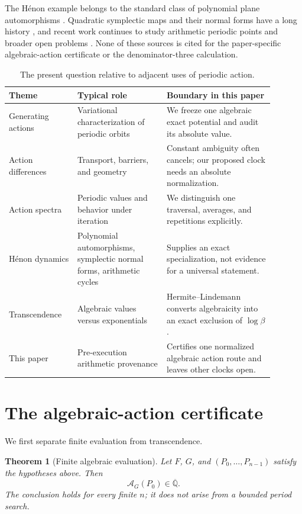 \documentclass[11pt]{article}
\newtheorem{theorem}{Theorem}[section]
\theoremstyle{definition}
\theoremstyle{remark}
\newcommand{\Qbar}{\overline{\mathbb Q}}
\newcommand{\Action}{\mathcal A}
\begin{document}
The H\'enon example belongs to the standard class of polynomial plane
automorphisms \citep{friedland1989dynamical}.  Quadratic symplectic maps and
their normal forms have a long history \citep{moser1994quadratic}, and recent
work continues to study arithmetic periodic points and broader open problems
\citep{dehenon2024open,kim2024many}.  None of these sources is cited for the
paper-specific algebraic-action certificate or the denominator-three
calculation.

\begin{table}[H]
\centering
\small
\caption{The present question relative to adjacent uses of periodic action.}
\label{tab:context}
\begin{tabular}{@{}p{0.23\linewidth}p{0.30\linewidth}p{0.36\linewidth}@{}}
\toprule
Theme & Typical role & Boundary in this paper \\
\midrule
Generating actions & Variational characterization of periodic orbits & We freeze one algebraic exact potential and audit its absolute value. \\
Action differences & Transport, barriers, and geometry & Constant ambiguity often cancels; our proposed clock needs an absolute normalization. \\
Action spectra & Periodic values and behavior under iteration & We distinguish one traversal, averages, and repetitions explicitly. \\
H\'enon dynamics & Polynomial automorphisms, symplectic normal forms, arithmetic cycles & Supplies an exact specialization, not evidence for a universal statement. \\
Transcendence & Algebraic values versus exponentials & Hermite--Lindemann converts algebraicity into an exact exclusion of $\log\beta$. \\
This paper & Pre-execution arithmetic provenance & Certifies one normalized algebraic action route and leaves other clocks open. \\
\bottomrule
\end{tabular}
\end{table}

\section{The algebraic-action certificate}
\label{sec:certificate}

We first separate finite evaluation from transcendence.

\begin{theorem}[Finite algebraic evaluation]
\label{thm:evaluation}
Let $F$, $G$, and $(P_0,\ldots,P_{n-1})$ satisfy the hypotheses above.
Then
\begin{equation}
  \Action_G(P_0)\in\Qbar.
  \label{eq:algebraic-action}
\end{equation}
The conclusion holds for every finite $n$; it does not arise from a bounded
period search.
\end{theorem}
\end{document}
